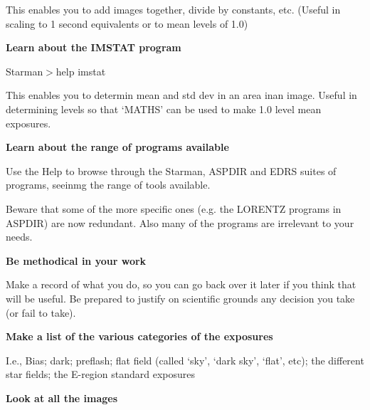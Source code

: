 {{ This enables you to add images together, divide by constants,
 etc. (Useful in scaling to 1 second equivalents or to
 mean levels of 1.0)
                                                                               
{\hspace*{4ex} \bf   Learn about the IMSTAT program }
                                                                               
 Starman$>$help imstat

 This enables you to determin mean and std dev in an area inan image.
 Useful in determining levels so that `MATHS' can be used to make
 1.0 level mean exposures.
                                                                               
{\hspace*{4ex} \bf   Learn about the range of programs available}
                                                                               
 Use the Help to browse through the Starman, ASPDIR and EDRS suites
 of programs, seeinmg the range of tools available.
                                                                               
 Beware that some of the more specific ones (e.g. the LORENTZ programs
 in ASPDIR) are now redundant. Also many of the programs are irrelevant
 to your needs.
                                                                               
{\hspace*{4ex} \bf   Be methodical in your work}
                                                                               
 Make a record of what you do, so you can go back over it later if you 
 think that will be useful. Be prepared to justify on scientific grounds 
 any decision you take (or fail to take).
                                                                               
{\hspace*{4ex} \bf   Make a list of the various categories of the exposures}
                                                                               
 I.e., Bias; dark; preflash; flat field (called `sky', `dark sky',
 `flat', etc); the different star fields; the E-region standard
 exposures
                                                                               
{\hspace*{4ex} \bf   Look at all the images}
                                                                               
}}
